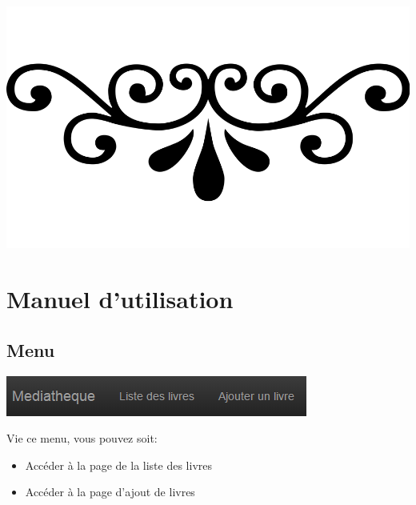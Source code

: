 \documentclass{report}
\begin{document}
	\begin{center}
	\includegraphics[scale=0.1]{img/fioritures.png} 
	\end{center} 
	
	\chapter{Manuel d'utilisation}
		\section{Menu}
		\begin{center}
			\includegraphics[scale=0.4]{img/manuel/menu.png}  
		\end{center}
		Vie ce menu, vous pouvez soit:
		\begin{itemize}
		\item Acc\'{e}der \`{a} la page de la liste des livres
		\item Acc\'{e}der \`{a} la page d'ajout de livres
		\end{itemize}
		 
\end{document}
